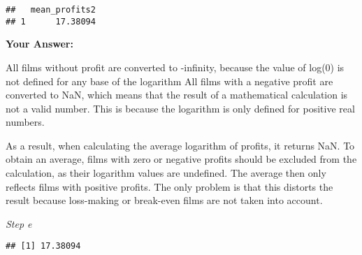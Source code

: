 \documentclass[
]{article}
\newenvironment{Shaded}{\begin{snugshade}}{\end{snugshade}}
\newcommand{\AttributeTok}[1]{\textcolor[rgb]{0.13,0.29,0.53}{#1}}
\newcommand{\CommentTok}[1]{\textcolor[rgb]{0.56,0.35,0.01}{\textit{#1}}}
\newcommand{\ConstantTok}[1]{\textcolor[rgb]{0.56,0.35,0.01}{#1}}
\newcommand{\DecValTok}[1]{\textcolor[rgb]{0.00,0.00,0.81}{#1}}
\newcommand{\FunctionTok}[1]{\textcolor[rgb]{0.13,0.29,0.53}{\textbf{#1}}}
\newcommand{\NormalTok}[1]{#1}
\newcommand{\OtherTok}[1]{\textcolor[rgb]{0.56,0.35,0.01}{#1}}
\newcommand{\SpecialCharTok}[1]{\textcolor[rgb]{0.81,0.36,0.00}{\textbf{#1}}}
\newcommand{\StringTok}[1]{\textcolor[rgb]{0.31,0.60,0.02}{#1}}
\begin{document}
\begin{verbatim}
##   mean_profits2
## 1      17.38094
\end{verbatim}

\textbf{Your Answer:}

All films without profit are converted to -infinity, because the value
of log(0) is not defined for any base of the logarithm All films with a
negative profit are converted to NaN, which means that the result of a
mathematical calculation is not a valid number. This is because the
logarithm is only defined for positive real numbers.

As a result, when calculating the average logarithm of profits, it
returns NaN. To obtain an average, films with zero or negative profits
should be excluded from the calculation, as their logarithm values are
undefined. The average then only reflects films with positive profits.
The only problem is that this distorts the result because loss-making or
break-even films are not taken into account.

\emph{Step e}

\begin{Shaded}
\end{Shaded}

\begin{verbatim}
## [1] 17.38094
\end{verbatim}

\begin{Shaded}
\end{Shaded}
\end{document}
